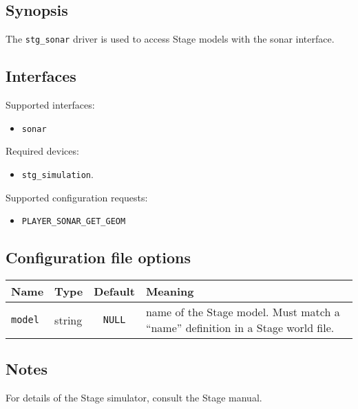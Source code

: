 \subsection*{Synopsis}

The {\tt stg\_sonar} driver is used to access Stage models with the
sonar interface.

\subsection*{Interfaces}

\noindent Supported interfaces:
\begin{itemize}
\item {\tt sonar}
\end{itemize}

\noindent Required devices:
\begin{itemize}
\item  {\tt stg\_simulation}.
\end{itemize}

\noindent Supported configuration requests:
\begin{itemize}
\item \verb+PLAYER_SONAR_GET_GEOM+
\end{itemize}


\subsection*{Configuration file options}

\begin{center}
{\small \begin{tabularx}{\columnwidth}{|l|l|c|X|}
\hline
Name & Type & Default & Meaning\\
\hline
{\tt model} & string & {\tt NULL} & name of the Stage model. Must match a ``name'' definition in a Stage world file. \\
\hline
\end{tabularx}}
\end{center}

\subsection*{Notes}

For details of the Stage simulator, consult the Stage manual.

